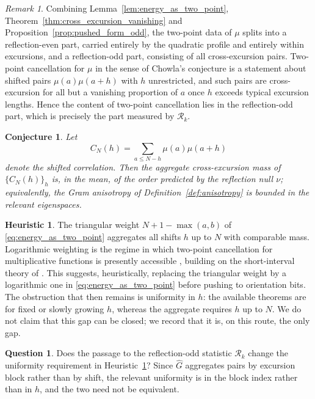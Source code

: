 \documentclass[11pt]{amsart}
\numberwithin{equation}{section}
\theoremstyle{plain}
\newtheorem{conjecture}[theorem]{Conjecture}
\theoremstyle{definition}
\newtheorem{heuristic}[theorem]{Heuristic}
\newtheorem{question}[theorem]{Question}
\theoremstyle{remark}
\newtheorem{remark}[theorem]{Remark}
\begin{document}
\begin{remark}
\label{rem:chowla_lives_in_the_odd_part}
Combining Lemma~\ref{lem:energy_as_two_point},
Theorem~\ref{thm:cross_excursion_vanishing} and
Proposition~\ref{prop:pushed_form_odd}, the two-point data of $\mu$
splits into a reflection-even part, carried entirely by the quadratic
profile and entirely within excursions, and a reflection-odd part,
consisting of all cross-excursion pairs. Two-point cancellation for
$\mu$ in the sense of Chowla's conjecture is a statement about shifted
pairs $\mu(a)\mu(a+h)$ with $h$ unrestricted, and such pairs are
cross-excursion for all but a vanishing proportion of $a$ once $h$
exceeds typical excursion lengths. Hence the content of two-point
cancellation lies in the reflection-odd part, which is precisely the
part measured by $\mathcal{R}_k$.
\end{remark}

\begin{conjecture}
\label{conj:cross_excursion_mass}
Let
\begin{equation}
C_N(h) = \sum_{a \le N - h} \mu(a)\mu(a+h)
\label{eq:shifted_correlation}
\end{equation}
denote the shifted correlation. Then the aggregate cross-excursion mass
of $\{C_N(h)\}_h$ is, in the mean, of the order predicted by the
reflection null $\nu$; equivalently, the Gram anisotropy of
Definition~\ref{def:anisotropy} is bounded in the relevant eigenspaces.
\end{conjecture}

\begin{heuristic}
\label{heur:logarithmic_weighting}
The triangular weight $N+1-\max(a,b)$ of
\eqref{eq:energy_as_two_point} aggregates all shifts $h$ up to $N$ with
comparable mass. Logarithmic weighting is the regime in which two-point
cancellation for multiplicative functions is presently accessible
\cite{Tao2016}, building on the short-interval theory of
\cite{MatomakiRadziwill2016}. This suggests, heuristically, replacing
the triangular weight by a logarithmic one in
\eqref{eq:energy_as_two_point} before pushing to orientation bits. The
obstruction that then remains is uniformity in $h$: the available
theorems are for fixed or slowly growing $h$, whereas the aggregate
requires $h$ up to $N$. We do not claim that this gap can be closed;
we record that it is, on this route, the only gap.
\end{heuristic}

\begin{question}
\label{q:odd_statistic_and_uniformity}
Does the passage to the reflection-odd statistic $\mathcal{R}_k$ change
the uniformity requirement in
Heuristic~\ref{heur:logarithmic_weighting}? Since
$\widehat{G}$ aggregates pairs by excursion block rather than by shift,
the relevant uniformity is in the block index rather than in $h$, and
the two need not be equivalent.
\end{question}
\end{document}
